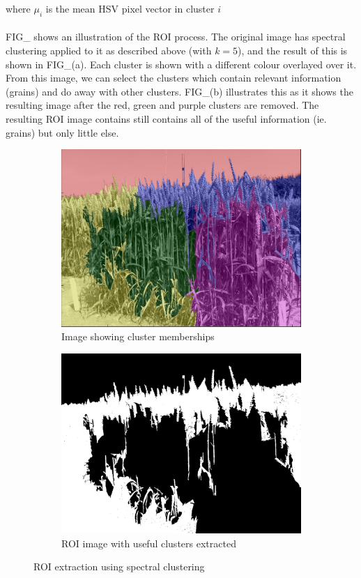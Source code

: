 where $\mu_i$ is the mean HSV pixel vector in cluster $i$\\ \\
%
FIG\_ shows an illustration of the ROI process. The original image has spectral clustering applied to it as described above (with $k = 5$), and the result of this is shown in FIG\_(a). Each cluster is shown with a different colour overlayed over it. From this image, we can select the clusters which contain relevant information (grains) and do away with other clusters. FIG\_(b) illustrates this as it shows the resulting image after the red, green and purple clusters are removed. The resulting ROI image contains still contains all of the useful information (ie. grains) but only little else.
\begin{figure}[ht!]
\begin{subfigure}{.5\textwidth}
\includegraphics[width=.9\linewidth,height=.7\linewidth,keepaspectratio]{clusters.png}
  \caption{Image showing cluster memberships}
  \label{fig:sub1}
\end{subfigure}%
\begin{subfigure}{.5\textwidth}
 \includegraphics[width=.9\linewidth,height=.7\linewidth,keepaspectratio]{roi.png}
  \caption{ROI image with useful clusters extracted}
  \label{fig:sub2}
\end{subfigure}
\caption{ROI extraction using spectral clustering}
\label{fig:test}
\end{figure}

